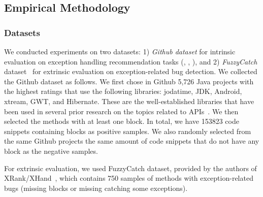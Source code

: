 \subsection{Empirical Methodology}

\subsubsection{Datasets}


We conducted experiments on two datasets: 1) {\em Github dataset}
for intrinsic evaluation on exception handling recommendation tasks
({\xblock}, {\xstate}, {\xtype}), and 2) {\em FuzzyCatch}
dataset~\cite{xrank-fse20} for extrinsic evaluation on
exception-related bug detection.
%
%
We collected the Github dataset as follows. We first chose in Github
5,726 Java projects with the highest ratings that use
the following libraries: jodatime, JDK, Android, xtream, GWT, and
Hibernate. These are the well-established libraries that have been used
in several prior research on the topics related to
APIs~\cite{icse18,liveapi14}. We then selected the methods with at
least one  block. 
In total, we have
153823 code snippets containing
 blocks as positive samples. We also randomly selected
from the same Github projects the same amount of code snippets that do
not have any  block as the negative samples.

For extrinsic evaluation, we used FuzzyCatch dataset, provided by the
authors of XRank/XHand~\cite{xrank-fse20}, which contains 750 samples
of methods with exception-related bugs (missing 
blocks or missing catching some exceptions).  


